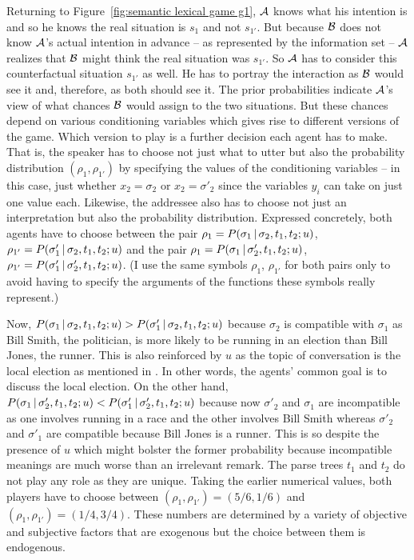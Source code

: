 Returning to Figure~\ref{fig:semantic lexical game g1}, $\cal A$ knows what his intention is and so he knows the real situation is $s_1$ and not $s_{1'}$. But because $\cal B$ does not know $\cal A$'s actual intention in advance -- as represented by the information set -- $\cal A$ realizes that $\cal B$ might think the real situation was $s_{1'}$. So $\cal A$ has to consider this counterfactual situation $s_{1'}$ as well. He has to portray the interaction as $\cal B$ would see it and, therefore, as both should see it. The prior probabilities indicate $\cal A$'s view of what chances $\cal B$ would assign to the two situations. But these chances depend on various conditioning variables which gives rise to different versions of the game. Which version to play is a further decision each agent has to make. That is, the speaker has to choose not just what to utter but also the probability distribution $(\rho_1, \rho_{1'})$ by specifying the values of the conditioning variables -- in this case, just whether $x_2 = \sigma_2$ or $x_2 = \sigma'_2$ since the variables $y_i$ can take on just one value each. Likewise, the addressee also has to choose not just an interpretation but also the probability distribution. Expressed concretely, both agents have to choose between the pair $\rho_1 = P(\sigma_1 \,|\, \sigma_2, t_1, t_2; u)$, $\rho_{1'} = P(\sigma'_1 \,|\, \sigma_2, t_1, t_2; u)$ and the pair $\rho_1 = P(\sigma_1 \,|\, \sigma'_2, t_1, t_2; u)$, $\rho_{1'} = P(\sigma'_1 \,|\, \sigma'_2, t_1, t_2; u)$. (I use the same symbols $\rho_1$, $\rho_{1'}$ for both pairs only to avoid having to specify the arguments of the functions these symbols really represent.) 

Now, $P(\sigma_1 \,|\, \sigma_2, t_1, t_2; u) > P(\sigma'_1 \,|\, \sigma_2, t_1, t_2; u)$ \label{page:probability comparisons} because $\sigma_2$ is compatible with $\sigma_1$ as Bill Smith, the politician, is more likely to be running in an election than Bill Jones, the runner. This is also reinforced by $u$ as the topic of conversation is the local election as mentioned in . In other words, the agents' common goal is to discuss the local election. On the other hand, $P(\sigma_1 \,|\, \sigma'_2, t_1, t_2; u) < P(\sigma'_1 \,|\, \sigma'_2, t_1, t_2; u)$ because now $\sigma'_2$ and $\sigma_1$ are incompatible as one involves running in a race and the other involves Bill Smith whereas $\sigma'_2$ and $\sigma'_1$ are compatible because Bill Jones is a runner. This is so despite the presence of $u$ which might bolster the former probability because incompatible meanings are much worse than an irrelevant remark. The parse trees $t_1$ and $t_2$ do not play any role as they are unique. Taking the earlier numerical values, both players have to choose between $(\rho_1, \rho_{1'}) = (5/6,1/6)$ and $(\rho_1, \rho_{1'}) = (1/4,3/4)$. These numbers are determined by a variety of objective and subjective factors that are exogenous but the choice between them is endogenous.

